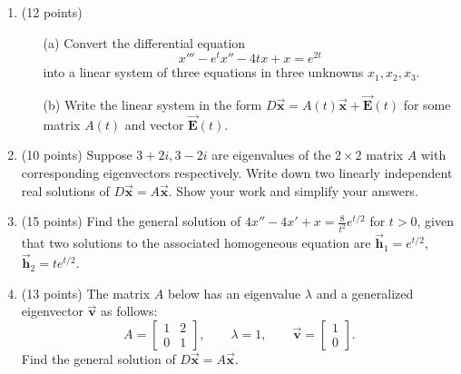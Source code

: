 \documentclass[12pt]{article}
\def\vh{\vec {\mathbf{h}}}
\def\vE{\vec {\mathbf{E}}}
\def\vx{\vec {\mathbf{x}}}
\def\vv{\vec {\mathbf{v}}}
\newcommand{\tred}[1]{{\color{black}{#1}}}
\begin{document}
\begin{enumerate}
        \newpage
\vspace*{-.5in}


\item (12 points)
        \begin{enumerate}
          \item[(a)] Convert the differential equation
        \[
         x'''-e^t x''-4tx + x = e^{2t}
        \]
        into a linear system of three equations in three unknowns
        $x_1, x_2, x_3$.
        \item[(b)] Write the linear system in the form $D\vx = A(t)
          \vx + \vE(t)$ for some matrix $A(t)$ and vector $\vE(t)$.
        \end{enumerate}
        
        \newpage

\item (10 points) Suppose $3+2i, 3-2i$ are eigenvalues of the $2 \times 2$
            matrix $A$ with corresponding eigenvectors \tred{
            $\begin{bmatrix} i\\1\end{bmatrix},
            \begin{bmatrix} -i\\ \phantom{-}1\end{bmatrix}$,}
            respectively.
            Write down two linearly independent real
            solutions of $D\vx = A \vx$.  Show your work and simplify
            your answers.
            
            \newpage
 \vspace*{-.5in}
        

\item (15 points) Find the general solution of $4x''-4x'+x = \frac{8}{t^2} e^{t/2}$
  for $t > 0$, given that two solutions to the associated homogeneous
  equation are $\vh_1 = e^{t/2}$, $\vh_2 = t e^{t/2}$.

          \newpage
         \item (13 points) The matrix $A$ below has an eigenvalue $\lambda$ and a generalized eigenvector $\vv$ as follows:
          \begin{equation*}
          A = \left[
            \begin{array}{rr}
              1 & 2  \\     0 & 1 
            \end{array}
          \right], \qquad \lambda =1, \qquad \vv = \begin{bmatrix} 1 \\ 0 \end{bmatrix}.
        \end{equation*}
Find the general solution of $D\vx = A \vx$.


\end{enumerate}
\end{document}

